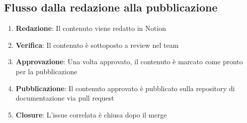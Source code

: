 \subsection{Flusso dalla redazione alla pubblicazione}

\begin{enumerate}
  \item \textbf{Redazione}: Il contenuto viene redatto in Notion
  \item \textbf{Verifica}: Il contenuto è sottoposto a review nel team
  \item \textbf{Approvazione}: Una volta approvato, il contenuto è marcato come pronto per la pubblicazione
  \item \textbf{Pubblicazione}: Il contenuto approvato è pubblicato sulla repository di documentazione via pull request
  \item \textbf{Closure}: L'issue correlata è chiusa dopo il merge
\end{enumerate}

